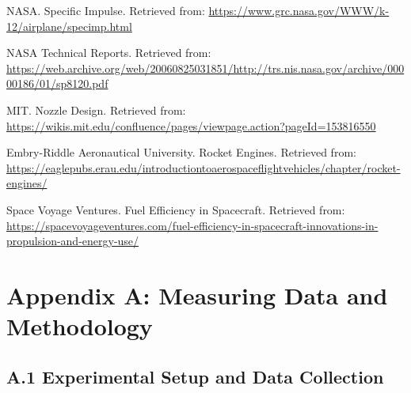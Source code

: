 \documentclass[12pt,a4paper]{article}
\begin{document}
\begin{thebibliography}{13}
 NASA. Specific Impulse. Retrieved from: \url{https://www.grc.nasa.gov/WWW/k-12/airplane/specimp.html}

 NASA Technical Reports. Retrieved from: \url{https://web.archive.org/web/20060825031851/http://trs.nis.nasa.gov/archive/00000186/01/sp8120.pdf}

 MIT. Nozzle Design. Retrieved from: \url{https://wikis.mit.edu/confluence/pages/viewpage.action?pageId=153816550}

 Embry-Riddle Aeronautical University. Rocket Engines. Retrieved from: \url{https://eaglepubs.erau.edu/introductiontoaerospaceflightvehicles/chapter/rocket-engines/}

 Space Voyage Ventures. Fuel Efficiency in Spacecraft. Retrieved from: \url{https://spacevoyageventures.com/fuel-efficiency-in-spacecraft-innovations-in-propulsion-and-energy-use/}

\end{thebibliography}

\newpage
\appendix

\section{Appendix A: Measuring Data and Methodology}

\subsection{A.1 Experimental Setup and Data Collection}
\end{document}
